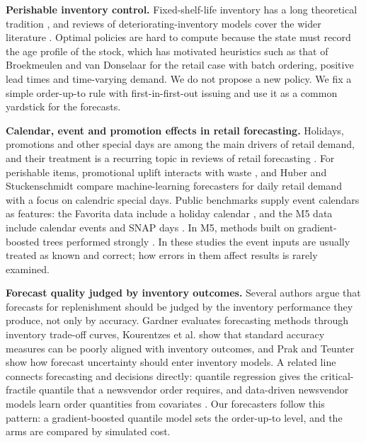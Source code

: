 \textbf{Perishable inventory control.} Fixed-shelf-life inventory has a long theoretical tradition \cite{nahmias1982perishable}, and reviews of deteriorating-inventory models cover the wider literature \cite{bakker2012review}. Optimal policies are hard to compute because the state must record the age profile of the stock, which has motivated heuristics such as that of Broekmeulen and van Donselaar \cite{broekmeulen2009heuristic} for the retail case with batch ordering, positive lead times and time-varying demand. We do not propose a new policy. We fix a simple order-up-to rule with first-in-first-out issuing and use it as a common yardstick for the forecasts.

\textbf{Calendar, event and promotion effects in retail forecasting.} Holidays, promotions and other special days are among the main drivers of retail demand, and their treatment is a recurring topic in reviews of retail forecasting \cite{fildes2022retail}. For perishable items, promotional uplift interacts with waste \cite{vandonselaar2016analysis}, and Huber and Stuckenschmidt \cite{huber2020daily} compare machine-learning forecasters for daily retail demand with a focus on calendric special days. Public benchmarks supply event calendars as features: the Favorita data include a holiday calendar \cite{favorita2018kaggle}, and the M5 data include calendar events and SNAP days \cite{makridakis2022m5background}. In M5, methods built on gradient-boosted trees \cite{friedman2001gbm, ke2017lightgbm} performed strongly \cite{makridakis2022m5}. In these studies the event inputs are usually treated as known and correct; how errors in them affect results is rarely examined.

\textbf{Forecast quality judged by inventory outcomes.} Several authors argue that forecasts for replenishment should be judged by the inventory performance they produce, not only by accuracy. Gardner \cite{gardner1990evaluating} evaluates forecasting methods through inventory trade-off curves, Kourentzes et al. \cite{kourentzes2020optimising} show that standard accuracy measures can be poorly aligned with inventory outcomes, and Prak and Teunter \cite{prak2019general} show how forecast uncertainty should enter inventory models. A related line connects forecasting and decisions directly: quantile regression \cite{koenker1978regression} gives the critical-fractile quantile that a newsvendor order requires, and data-driven newsvendor models learn order quantities from covariates \cite{ban2019big, bertsimas2020predictive}. Our forecasters follow this pattern: a gradient-boosted quantile model sets the order-up-to level, and the arms are compared by simulated cost.

